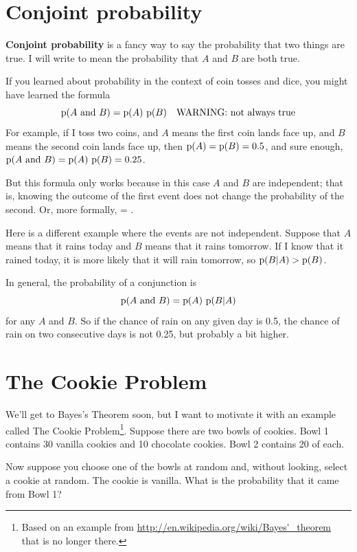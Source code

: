 \documentclass[12pt]{book}
\begin{document}
\section{Conjoint probability}

{\bf Conjoint probability} is a fancy way to say the probability that
two things are true.  I will write  to mean the
probability that $A$ and $B$ are both true.

If you learned about probability in the context of coin tosses and
dice, you might have learned the formula
%
\[ \mathrm{p}(A ~\mathrm{and}~ B) = \mathrm{p}(A)~\mathrm{p}(B) \quad\mbox{WARNING: not always true}\]
%
For example, if I toss two coins, and $A$ means the first coin lands
face up, and $B$ means the second coin lands face up, then $\mathrm{p}(A) =
\mathrm{p}(B) = 0.5$, and sure enough, $\mathrm{p}(A ~\mathrm{and}~ B) = \mathrm{p}(A)~\mathrm{p}(B) = 0.25$.

But this formula only works because in this case $A$ and $B$ are
independent; that is, knowing the outcome of the first event does
not change the probability of the second.  Or, more formally,
 = .

Here is a different example where the events are not independent.
Suppose that $A$ means that it rains today and $B$ means that it
rains tomorrow.  If I know that it rained today, it is more likely
that it will rain tomorrow, so $\mathrm{p}(B|A) > \mathrm{p}(B)$.

In general, the probability of a conjunction is
%
\[ \mathrm{p}(A ~\mathrm{and}~ B) = \mathrm{p}(A)~\mathrm{p}(B|A) \]
%
for any $A$ and $B$.  So if the chance of rain on any given day
is 0.5, the chance of rain on two consecutive days is not
0.25, but probably a bit higher.


\section{The Cookie Problem}

We'll get to Bayes's Theorem soon, but I want to motivate it with an
example called The Cookie Problem\footnote{Based on an example from
  \url{http://en.wikipedia.org/wiki/Bayes'_theorem} that is no longer
  there.}.  Suppose there are two bowls of cookies.  Bowl 1 contains
  30 vanilla cookies and 10 chocolate cookies.  Bowl 2 contains 20 of
  each.

Now suppose you choose one of the bowls at random and, without
looking, select a cookie at random.  The cookie is vanilla.  What is
the probability that it came from Bowl 1?
\end{document}
